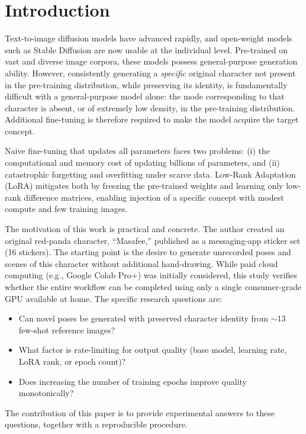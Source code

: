 \documentclass[10pt,twocolumn]{article}
\begin{document}
\section{Introduction}
Text-to-image diffusion models have advanced rapidly, and open-weight models such as Stable Diffusion are now usable at the individual level. Pre-trained on vast and diverse image corpora, these models possess general-purpose generation ability. However, consistently generating a \emph{specific} original character not present in the pre-training distribution, while preserving its identity, is fundamentally difficult with a general-purpose model alone: the mode corresponding to that character is absent, or of extremely low density, in the pre-training distribution. Additional fine-tuning is therefore required to make the model acquire the target concept.

Naive fine-tuning that updates all parameters faces two problems: (i) the computational and memory cost of updating billions of parameters, and (ii) catastrophic forgetting and overfitting under scarce data. Low-Rank Adaptation (LoRA) mitigates both by freezing the pre-trained weights and learning only low-rank difference matrices, enabling injection of a specific concept with modest compute and few training images.

The motivation of this work is practical and concrete. The author created an original red-panda character, ``Masafee,'' published as a messaging-app sticker set (16 stickers). The starting point is the desire to generate unrecorded poses and scenes of this character without additional hand-drawing. While paid cloud computing (e.g., Google Colab Pro+) was initially considered, this study verifies whether the entire workflow can be completed using only a single consumer-grade GPU available at home. The specific research questions are:
\begin{itemize}[leftmargin=2.4em,topsep=2pt,itemsep=1pt]
  \item[\textbf{Q1.}] Can novel poses be generated with preserved character identity from $\sim$13 few-shot reference images?
  \item[\textbf{Q2.}] What factor is rate-limiting for output quality (base model, learning rate, LoRA rank, or epoch count)?
  \item[\textbf{Q3.}] Does increasing the number of training epochs improve quality monotonically?
\end{itemize}
The contribution of this paper is to provide experimental answers to these questions, together with a reproducible procedure.
\end{document}
